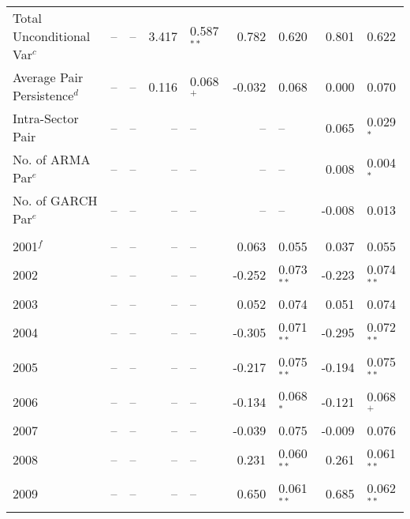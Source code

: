 \begin{table}
\begin{tabular}{l r l r l r l r l}
        Total Unconditional Var$^{c}$      &     -- & --            &   3.417 & 0.587$^{**}$ &   0.782 & 0.620         &   0.801 & 0.622         \\
        Average Pair Persistence$^{d}$     &     -- & --            &   0.116 & 0.068$^{+}$  &  -0.032 & 0.068         &   0.000 & 0.070         \\
        Intra-Sector Pair                  &     -- & --            &      -- & --           &      -- & --            &   0.065 & 0.029$^{*}$   \\
        No. of ARMA Par$^{e}$              &     -- & --            &      -- & --           &      -- & --            &   0.008 & 0.004$^{*}$   \\
        No. of GARCH Par$^{e}$             &     -- & --            &      -- & --           &      -- & --            &  -0.008 & 0.013         \\  \\
        2001$^{f}$                         &     -- & --            &      -- & --           &   0.063 & 0.055         &   0.037 & 0.055         \\
        2002                               &     -- & --            &      -- & --           &  -0.252 & 0.073$^{**}$  &  -0.223 & 0.074$^{**}$  \\
        2003                               &     -- & --            &      -- & --           &   0.052 & 0.074         &   0.051 & 0.074         \\
        2004                               &     -- & --            &      -- & --           &  -0.305 & 0.071$^{**}$  &  -0.295 & 0.072$^{**}$  \\
        2005                               &     -- & --            &      -- & --           &  -0.217 & 0.075$^{**}$  &  -0.194 & 0.075$^{**}$  \\
        2006                               &     -- & --            &      -- & --           &  -0.134 & 0.068$^{*}$   &  -0.121 & 0.068$^{+}$   \\
        2007                               &     -- & --            &      -- & --           &  -0.039 & 0.075         &  -0.009 & 0.076         \\
        2008                               &     -- & --            &      -- & --           &   0.231 & 0.060$^{**}$  &   0.261 & 0.061$^{**}$  \\
        2009                               &     -- & --            &      -- & --           &   0.650 & 0.061$^{**}$  &   0.685 & 0.062$^{**}$  \\

\end{tabular}
\end{table}
